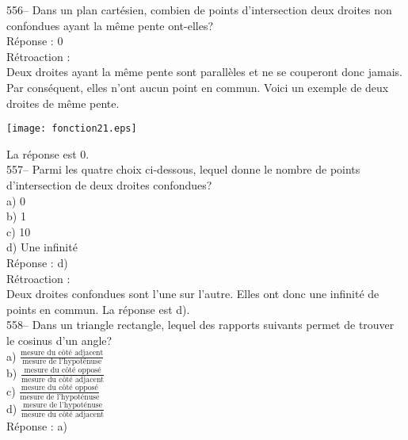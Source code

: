 ﻿\documentclass[letterpaper, 12pt]{article}
\begin{document}
556-- Dans un plan cart\'esien, combien de points d'intersection deux
droites non confondues ayant la m\^eme pente ont-elles?\\

R\'eponse : 0\\

R\'etroaction :\\
Deux droites ayant la m\^eme pente sont parall\`eles et ne se couperont donc
jamais.  Par cons\'equent, elles n'ont aucun point en commun.  Voici un
exemple de deux droites de m\^eme pente.\\
    \begin{center}
    \texttt{[image: fonction21.eps]}
    \end{center}

La r\'eponse est 0.\\



557-- Parmi les quatre choix ci-dessous, lequel donne le nombre de points
d'intersection de deux droites confondues?\\
a) 0\\
b) 1\\
c) 10\\
d) Une infinit\'e\\

R\'eponse : d)\\

R\'etroaction : \\
Deux droites confondues sont l'une sur l'autre.  Elles ont donc une
infinit\'e de points en commun.  La r\'eponse est d).\\

558-- Dans un triangle rectangle, lequel des rapports suivants permet de
trouver le cosinus d'un angle?\\[2mm]
a) $\frac{\textrm{mesure du c\^ot\'e adjacent}}{\textrm{mesure de
l'hypot\'enuse}}$\\[2mm]
b) $\frac{\textrm{mesure du c\^ot\'e oppos\'e}}{\textrm{mesure du c\^ot\'e
adjacent}}$\\[2mm]
c) $\frac{\textrm{mesure du c\^ot\'e oppos\'e}}{\textrm{mesure de
l'hypot\'enuse}}$\\[2mm]
d) $\frac{\textrm{mesure de l'hypot\'enuse}}{\textrm{mesure du c\^ot\'e
adjacent}}$\\

R\'eponse : a)\\
\end{document}
